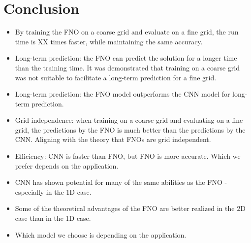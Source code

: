 \chapter{Conclusion}\label{ch:conclusion}






\begin{itemize}
    \item By training the FNO on a coarse grid and evaluate on a fine grid, the run time is XX times faster, while maintaining the same accuracy.
    \item Long-term prediction: the FNO can predict the solution for a longer time than the training time.
    It was demonstrated that training on a coarse grid was not suitable to facilitate a long-term prediction for a fine grid.
    \item Long-term prediction: the FNO model outperforms the CNN model for long-term prediction.
    \item Grid independence: when training on a coarse grid and evaluating on a fine grid, the predictions by the FNO is much better than the predictions by the CNN. Aligning with the theory that FNOs are grid independent.
    \item Efficiency: CNN is faster than FNO, but FNO is more accurate. Which we prefer depends on the application.
    \item CNN has shown potential for many of the same abilities as the FNO - especially in the 1D case.
    \item Some of the theoretical advantages of the FNO are better realized in the 2D case than in the 1D case.
    \item Which model we choose is depending on the application.
\end{itemize}





